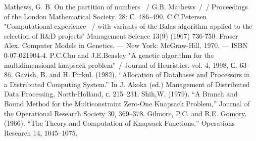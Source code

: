 \begin{thebibliography}{100}
Mathews, G. B. On the partition of numbers ~/
G.B. Mathews~/~/
Proceedings of the London Mathematical Society. 28: С. 486–490. 
C.C.Petersen "Computational experience ~/
with variants of the Balas algorithm applied to the selection
of R\&D projects" Management Science 13(9) (1967) 736-750.
Fraser Alex. Computer Models in Genetics. — New York: McGraw-Hill, 1970. — ISBN 0-07-021904-4.
P.C.Chu and J.E.Beasley "A genetic algorithm for the multidimensional knapsack problem"~/
 Journal of Heuristics, vol. 4, 1998, С. 63-86.
Gavish, B. and H. Pirkul. (1982). “Allocation of Databases and Processors in a Distributed Computing
System.” In J. Akoka (ed.) Management of Distributed Data Processing, North-Holland, с. 215–231.
Shih,W. (1979). “A Branch and Bound Method for the Multiconstraint Zero-One Knapsack Problem,” Journal of
the Operational Research Society 30, 369–378.
Gilmore, P.C. and R.E. Gomory. (1966). “The Theory and Computation of Knapsack Functions,” Operations
Research 14, 1045–1075.
\end{thebibliography}
